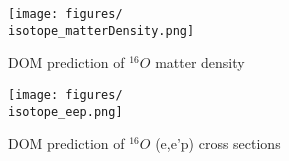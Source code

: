{    \begin{figure}[H]
        \centering
            \texttt{[image: figures/\\isotope\_matterDensity.png]}
            \caption{DOM prediction of $^{16}O$ matter density}
    \end{figure}

    \begin{figure}[H]
        \begin{center}
            \texttt{[image: figures/\\isotope\_eep.png]}
            \caption{DOM prediction of $^{16}O$ (e,e'p) cross sections}
        \end{center}
    \end{figure}
}
